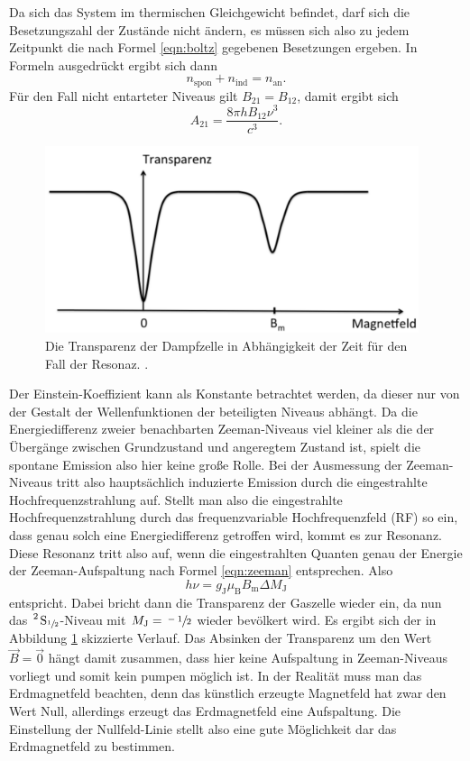 Da sich das System im thermischen Gleichgewicht befindet, darf sich die Besetzungszahl der Zustände nicht ändern,
es müssen sich also zu jedem Zeitpunkt die nach Formel \eqref{eqn:boltz} gegebenen Besetzungen ergeben. In Formeln ausgedrückt
ergibt sich dann
\begin{equation*}
  n_\text{spon} + n_\text{ind} = n_\text{an}.
\end{equation*}
Für den Fall nicht entarteter Niveaus gilt $B_{21} = B_{12}$, damit ergibt sich
\begin{equation}
  \label{eqn:a}
  A_{21} = \frac{8 \pi h B_{12} \nu^3}{c^3}.
\end{equation}
\begin{figure}
  \centering
  \includegraphics[height=5.5cm]{content/pictures/Resonanz.png}
  \caption{Die Transparenz der Dampfzelle in Abhängigkeit der Zeit für den Fall der Resonaz. \cite{anleitung}.}
  \label{fig:resonanz}
\end{figure}
Der Einstein-Koeffizient kann als Konstante betrachtet werden, da dieser nur von der Gestalt der 
Wellenfunktionen der beteiligten Niveaus abhängt. Da die Energiedifferenz zweier benachbarten Zeeman-Niveaus viel kleiner als
die der Übergänge zwischen Grundzustand und angeregtem Zustand ist, spielt die
spontane Emission also hier keine große Rolle. Bei der Ausmessung der Zeeman-Niveaus tritt also hauptsächlich
induzierte Emission durch die eingestrahlte Hochfrequenzstrahlung auf.
Stellt man also die eingestrahlte Hochfrequenzstrahlung durch das frequenzvariable Hochfrequenzfeld (RF) so ein,
dass genau solch eine Energiedifferenz getroffen wird, kommt es zur Resonanz.
Diese Resonanz tritt also auf, wenn die eingestrahlten Quanten genau der Energie der Zeeman-Aufspaltung nach Formel \eqref{eqn:zeeman} entsprechen.
Also 
\begin{equation*}
  h \nu = g_\text{J} \mu_\text{B} B_\text{m} \Delta M_\text{J}
\end{equation*}
entspricht. Dabei bricht dann die Transparenz der Gaszelle wieder ein, da nun das $\ce{^2 S_{\sfrac{1}{2}}}$-Niveau mit $M_\text{J}=\sfrac{-1}{2}$ wieder 
bevölkert wird. Es ergibt sich der in Abbildung \ref{fig:resonanz} skizzierte Verlauf.
Das Absinken der Transparenz um den Wert $\vec{B}=\vec{0}$ hängt damit zusammen, dass hier keine Aufspaltung in Zeeman-Niveaus vorliegt
und somit kein pumpen möglich ist. In der Realität muss man das Erdmagnetfeld beachten, denn das 
künstlich erzeugte Magnetfeld hat zwar den Wert Null, allerdings erzeugt das Erdmagnetfeld eine Aufspaltung. Die Einstellung der Nullfeld-Linie
stellt also eine gute Möglichkeit dar das Erdmagnetfeld zu bestimmen.

